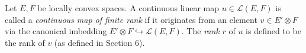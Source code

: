 Let $E, F$ be locally convex spaces. A continuous linear map $u \in \mathcal{L}(E, F)$ is called a \emph{continuous map of finite rank} if it originates from an element $v \in E' \otimes F$ via the canonical imbedding $E' \otimes F \hookrightarrow \mathcal{L}(E, F)$. The \emph{rank} $r$ of $u$ is defined to be the rank of $v$ (as defined in Section 6).
